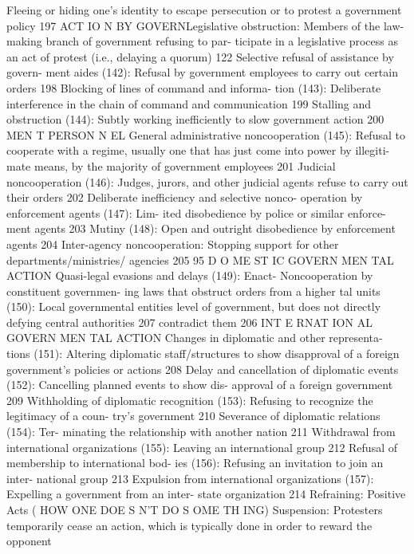 \documentclass[twoside,a4paper,12pt,fleqn,openany]{extbook}
\begin{document}
Fleeing or hiding one’s identity to escape
persecution or to protest a government
policy
 197
ACT IO N BY GOVERNLegislative obstruction: Members of the law-
making branch of government refusing to par-
ticipate in a legislative process as an act of
protest (i.e., delaying a quorum)
 122
Selective refusal of assistance by govern-
ment aides (142): Refusal by government
employees to carry out certain orders
 198
Blocking of lines of command and informa-
tion (143): Deliberate interference in the chain
of command and communication
 199
Stalling and obstruction (144): Subtly working
inefficiently to slow government action 200
MEN T PERSON N EL
General administrative noncooperation (145):
Refusal to cooperate with a regime, usually
one that has just come into power by illegiti-
mate means, by the majority of government
employees
 201
Judicial noncooperation (146): Judges, jurors,
and other judicial agents refuse to carry out
their orders
 202
Deliberate inefficiency and selective nonco-
operation by enforcement agents (147): Lim-
ited disobedience by police or similar enforce-
ment agents
 203
Mutiny (148): Open and outright disobedience
by enforcement agents
 204
Inter-agency noncooperation: Stopping
support for other departments/ministries/
agencies
 205
95
D O ME ST IC GOVERN MEN TAL ACTION
Quasi-legal evasions and delays (149): Enact-
 Noncooperation by constituent governmen-
ing laws that obstruct orders from a higher
 tal units (150): Local governmental entities
level of government, but does not directly
 defying central authorities
 207
contradict them
 206
INT E RNAT ION AL GOVERN MEN TAL ACTION
Changes in diplomatic and other representa-
tions (151): Altering diplomatic staff/structures
to show disapproval of a foreign government’s
policies or actions
 208
Delay and cancellation of diplomatic events
(152): Cancelling planned events to show dis-
approval of a foreign government
 209
Withholding of diplomatic recognition (153):
Refusing to recognize the legitimacy of a coun-
try’s government
 210
Severance of diplomatic relations (154): Ter-
minating the relationship with another nation		
211
Withdrawal from international organizations
(155): Leaving an international group
 212
Refusal of membership to international bod-
ies (156): Refusing an invitation to join an inter-
national group
 213
Expulsion from international organizations
(157): Expelling a government from an inter-
state organization
 214
Refraining: Positive Acts
( HOW ONE DOE S N’T DO S OME TH ING)
Suspension: Protesters temporarily cease an
action, which is typically done in order to
reward the opponent
\end{document}
